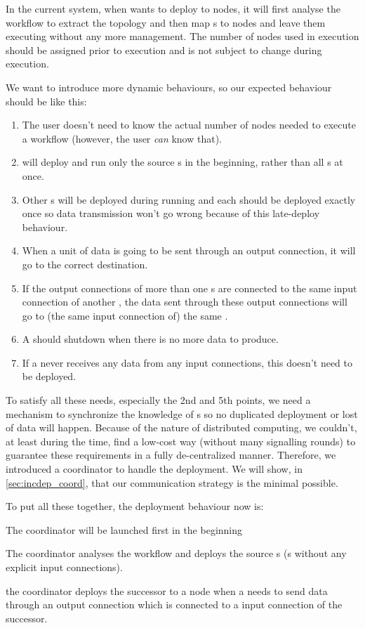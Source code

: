 In the current \dpy system, when \dpy wants to deploy \tPEInst to nodes, it will first analyse the workflow to extract the topology and then map \tPEInst{}s to nodes and leave them executing without any more management. The number of nodes used in execution should be assigned prior to execution and is not subject to change during execution.

We want to introduce more dynamic behaviours, so our expected behaviour should be like this:
\begin{enumerate}
	\item The user doesn't need to know the actual number of nodes needed to execute a workflow (however, the user \emph{can} know that).
	\item \Dpy will deploy and run only the source \tPEInst{}s in the beginning, rather than all \tPEInst{}s at once.
	\item Other \tPEInst{}s will be deployed during running and each \tPEInst should be deployed exactly once so data transmission won't go wrong because of this late-deploy behaviour.
	\item When a unit of data is going to be sent through an output connection, it will go to the correct destination.
	\item If the output connections of more than one \tPEInst{}s are connected to the same input connection of another \tPEInst, the data sent through these output connections will go to (the same input connection of) the same \tPEInst.
	\item A \tPEInst should shutdown when there is no more data to produce.
	\item If a \tPEInst never receives any data from any input connections, this \tPEInst doesn't need to be deployed.
\end{enumerate}

To satisfy all these needs, especially the 2nd and 5th points, we need a mechanism to synchronize the knowledge of \tPEInst{}s so no duplicated deployment or lost of data will happen. Because of the nature of distributed computing, we couldn't, at least during the time, find a low-cost way (\ie without many signalling rounds) to guarantee these requirements in a fully de-centralized manner. Therefore, we introduced a coordinator to handle the deployment. We will show, in \ref{sec:incdep_coord}, that our communication strategy is the minimal possible.

To put all these together, the deployment behaviour now is:
\begin{enumerate*}
	\item The coordinator will be launched first in the beginning
	\item The coordinator analyses the workflow and deploys the source \tPEInst{}s (\ie \tPEInst{}s without any explicit input connections).
	\item the coordinator deploys the successor \tPEInst to a node when a \tPEInst needs to send data through an output connection which is connected to a input connection of the successor.
\end{enumerate*}


